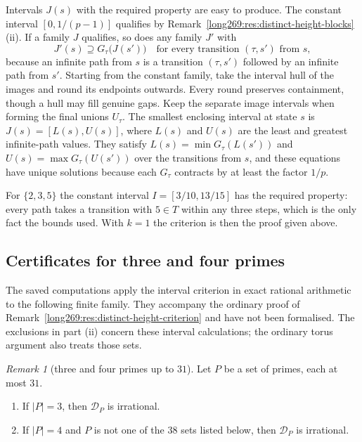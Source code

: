 \documentclass[11pt]{article}
\theoremstyle{remark}
\newtheorem{recordremark}[theorem]{Remark}
\renewenvironment{remark}[1][]{\begin{recordremark}[#1]}{\end{recordremark}}
\theoremstyle{plain}
\begin{document}
Intervals $J(s)$ with the required property are easy to produce.  The
constant interval $[0,1/(p-1)]$ qualifies by
Remark~\ref{long269:res:distinct-height-blocks}(ii).  If a family $J$
qualifies, so does any family $J'$ with
\[
 J'(s)\supseteq G_\tau\bigl(J(s')\bigr)\quad\text{for every transition }(\tau,s')\text{ from }s,
\]
because an infinite path from $s$ is a transition $(\tau,s')$ followed by an
infinite path from $s'$.  Starting from the constant family, take the interval hull of the images
and round its endpoints outwards. Every round preserves containment, though
a hull may fill genuine gaps. Keep the separate image intervals when
forming the final unions $U_\tau$. The smallest enclosing interval at state
$s$ is $J(s)=[L(s),U(s)]$, where $L(s)$ and $U(s)$ are the least and
greatest infinite-path values.  They satisfy
$L(s)=\min G_\tau(L(s'))$ and $U(s)=\max G_\tau(U(s'))$ over the transitions
from $s$, and these equations have unique solutions because each $G_\tau$
contracts by at least the factor $1/p$.

For $\{2,3,5\}$ the constant interval $I=[3/10,13/15]$ has the required
property: every path takes a transition with $5\in T$ within any three
steps, which is the only fact the bounds used.  With $k=1$ the criterion is
then the proof given above.

\subsection{Certificates for three and four primes}
\label{long269:sec:distinct-certificates}

The saved computations apply the interval criterion in exact rational
arithmetic to the following finite family. They accompany the ordinary
proof of Remark~\ref{long269:res:distinct-height-criterion} and have not
been formalised. The exclusions in part (ii) concern these interval
calculations; the ordinary torus argument also treats those sets.


\begin{remark}[three and four primes up to $31$]\label{long269:res:distinct-height-sets}
Let $P$ be a set of primes, each at most $31$.
\begin{enumerate}[label=\textup{(\roman*)}]
\item If $|P|=3$, then $\mathcal D_P$ is irrational.
\item If $|P|=4$ and $P$ is not one of the $38$ sets listed below, then
$\mathcal D_P$ is irrational.
\end{enumerate}
\end{remark}
\end{document}
